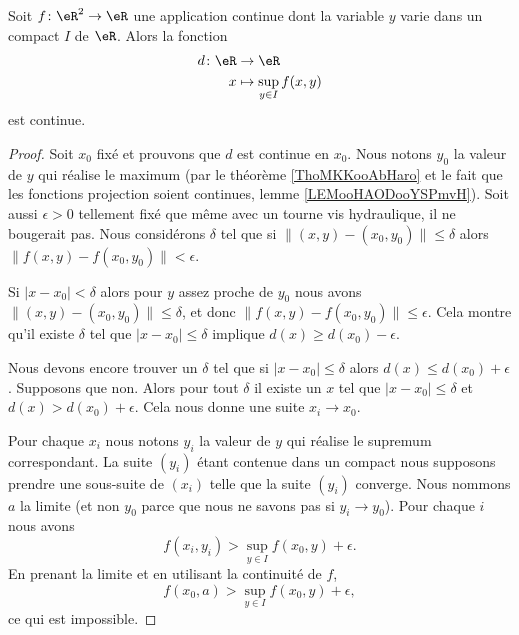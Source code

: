 \begin{proposition}      \label{PROPooWXBAooAEweSF}
    Soit \( f\colon \eR^2\to \eR\) une application continue dont la variable \( y\) varie dans un compact \( I\) de \( \eR\). Alors la fonction
    \begin{equation}
        \begin{aligned}
            d\colon \eR&\to \eR \\
            x&\mapsto \sup_{y\in I} f(x,y) 
        \end{aligned}
    \end{equation}
    est continue.
\end{proposition}

\begin{proof}
    Soit \( x_0\) fixé et prouvons que \( d\) est continue en \( x_0\). Nous notons \( y_0\) la valeur de \( y\) qui réalise le maximum (par le théorème \ref{ThoMKKooAbHaro} et le fait que les fonctions projection soient continues, lemme \ref{LEMooHAODooYSPmvH}). Soit aussi \( \epsilon>0\) tellement fixé que même avec un tourne vis hydraulique, il ne bougerait pas. Nous considérons \( \delta\) tel que si \( \| (x,y)-(x_0,y_0) \|\leq \delta\) alors \( \| f(x,y)-f(x_0,y_0) \|<\epsilon\).

    Si \( | x-x_0 |<\delta\) alors pour \( y\) assez proche de \( y_0\) nous avons \( \| (x,y)-(x_0,y_0) \|\leq \delta\), et donc \( \| f(x,y)-f(x_0,y_0) \|\leq \epsilon \). Cela montre qu'il existe \( \delta\) tel que \( | x-x_0 |\leq \delta\) implique \( d(x)\geq d(x_0)-\epsilon\).

    Nous devons encore trouver un \( \delta\) tel que si \( | x-x_0 |\leq \delta\) alors \( d(x)\leq d(x_0)+\epsilon\). Supposons que non. Alors pour tout \( \delta\) il existe un \( x\) tel que \( | x-x_0 |\leq \delta\) et \( d(x)> d(x_0)+\epsilon\). Cela nous donne une suite \( x_i\to x_0\).

    Pour chaque \( x_i\) nous notons \( y_i\) la valeur de \( y\) qui réalise le supremum correspondant. La suite \( (y_i)\) étant contenue dans un compact nous supposons prendre une sous-suite de \( (x_i)\) telle que la suite \( (y_i)\) converge. Nous nommons \( a\) la limite (et non \( y_0\) parce que nous ne savons pas si \( y_i\to y_0\)). Pour chaque \( i\) nous avons
    \begin{equation}
        f(x_i,y_i)>\sup_{y\in I}f(x_0,y)+\epsilon.
    \end{equation}
    En prenant la limite et en utilisant la continuité de \( f\),
    \begin{equation}
        f(x_0,a)>\sup_{y\in I} f(x_0,y)+\epsilon,
    \end{equation}
    ce qui est impossible.
\end{proof}


